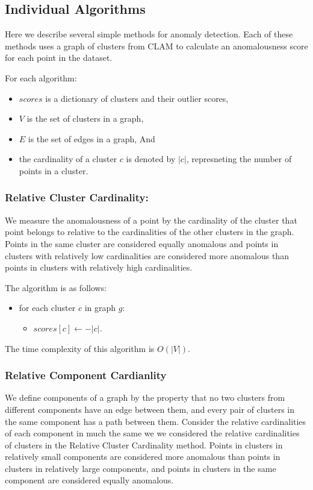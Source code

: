 \subsection{Individual Algorithms}\label{subsec:methods:individual-algorithms}

Here we describe several simple methods for anomaly detection.
Each of these methods uses a graph of clusters from CLAM to calculate an anomalousness score for each point in the dataset.

For each algorithm:
\begin{itemize}
    \item $scores$ is a dictionary of clusters and their outlier scores,
    \item $V$ is the set of clusters in a graph,
    \item $E$ is the set of edges in a graph, And
    \item the cardinality of a cluster $c$ is denoted by $|c|$, represneting the number of points in a cluster.
\end{itemize}

\subsubsection{Relative Cluster Cardinality:}
We measure the anomalousness of a point by the cardinality of the cluster that point belongs to relative to the cardinalities of the other clusters in the graph.
Points in the same cluster are considered equally anomalous and points in clusters with relatively low cardinalities are considered more anomalous than points in clusters with relatively high cardinalities.

The algorithm is as follows:

\begin{itemize}
    \item for each cluster $c$ in graph $g$:
    \begin{itemize}
        \item $scores[c] \leftarrow -|c|$.
    \end{itemize}
\end{itemize}

The time complexity of this algorithm is $O(|V|)$.

\subsubsection{Relative Component Cardianlity}
We define components of a graph by the property that no two clusters from different components have an edge between them, and every pair of clusters in the same component has a path between them.
Consider the relative cardinalities of each component in much the same we we considered the relative cardinalities of clusters in the Relative Cluster Cardinality method.
Points in clusters in relatively small components are considered more anomalous than points in clusters in relatively large components, and points in clusters in the same component are considered equally anomalous.

